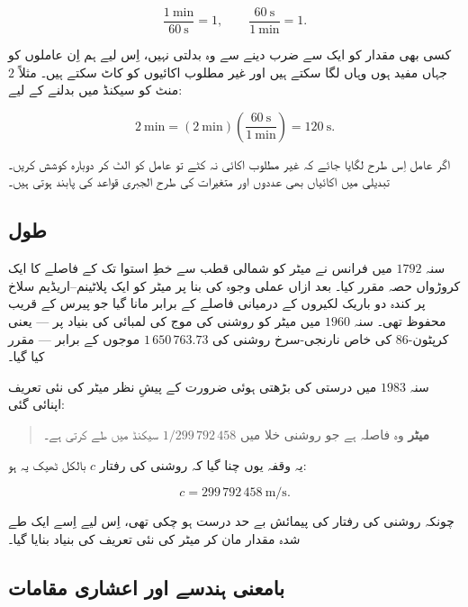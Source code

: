 \documentclass{urdu-textbook}
\begin{document}
\[\frac{1\ \mathrm{min}}{60\ \mathrm{s}} = 1, \qquad \frac{60\ \mathrm{s}}{1\ \mathrm{min}} = 1.\]

کسی بھی مقدار کو ایک سے ضرب دینے سے وہ بدلتی نہیں، اِس لیے ہم اِن عاملوں
کو جہاں مفید ہوں وہاں لگا سکتے ہیں اور غیر مطلوب اکائیوں کو کاٹ سکتے
ہیں۔ مثلاً \(2\) منٹ کو سیکنڈ میں بدلنے کے لیے:

\[2\ \mathrm{min} = (2\ \mathrm{min})\left(\frac{60\ \mathrm{s}}{1\ \mathrm{min}}\right) = 120\ \mathrm{s}.\]

اگر عامل اِس طرح لگایا جائے کہ غیر مطلوب اکائی نہ کٹے تو عامل کو الٹ کر
دوبارہ کوشش کریں۔ تبدیلی میں اکائیاں بھی عددوں اور متغیرات کی طرح الجبری
قواعد کی پابند ہوتی ہیں۔

\hypertarget{ux637ux648ux644}{%
\subsection{طول}\label{ux637ux648ux644}}

سنہ \(1792\) میں فرانس نے میٹر کو شمالی قطب سے خطِ استوا تک کے فاصلے کا
ایک کروڑواں حصہ مقرر کیا۔ بعد ازاں عملی وجوہ کی بنا پر میٹر کو ایک
پلاٹینم--اریڈیم سلاخ پر کندہ دو باریک لکیروں کے درمیانی فاصلے کے برابر
مانا گیا جو پیرس کے قریب محفوظ تھی۔ سنہ \(1960\) میں میٹر کو روشنی کی
موج کی لمبائی کی بنیاد پر --- یعنی کرپٹون-\(86\) کی خاص نارنجی-سرخ روشنی
کی \(1\,650\,763.73\) موجوں کے برابر --- مقرر کیا گیا۔

سنہ \(1983\) میں درستی کی بڑھتی ہوئی ضرورت کے پیشِ نظر میٹر کی نئی تعریف
اپنائی گئی:

\begin{quote}
\textbf{میٹر} وہ فاصلہ ہے جو روشنی خلا میں \(1/299\,792\,458\) سیکنڈ میں
طے کرتی ہے۔
\end{quote}

یہ وقفہ یوں چنا گیا کہ روشنی کی رفتار \(c\) بالکل ٹھیک یہ ہو:

\[c = 299\,792\,458\ \mathrm{m/s}.\]

چونکہ روشنی کی رفتار کی پیمائش بے حد درست ہو چکی تھی، اِس لیے اِسے ایک طے
شدہ مقدار مان کر میٹر کی نئی تعریف کی بنیاد بنایا گیا۔

\hypertarget{ux628ux627ux645ux639ux646ux6cc-ux6c1ux646ux62fux633ux6d2-ux627ux648ux631-ux627ux639ux634ux627ux631ux6cc-ux645ux642ux627ux645ux627ux62a}{%
\subsection{بامعنی ہندسے اور اعشاری
مقامات}\label{ux628ux627ux645ux639ux646ux6cc-ux6c1ux646ux62fux633ux6d2-ux627ux648ux631-ux627ux639ux634ux627ux631ux6cc-ux645ux642ux627ux645ux627ux62a}}
\end{document}
